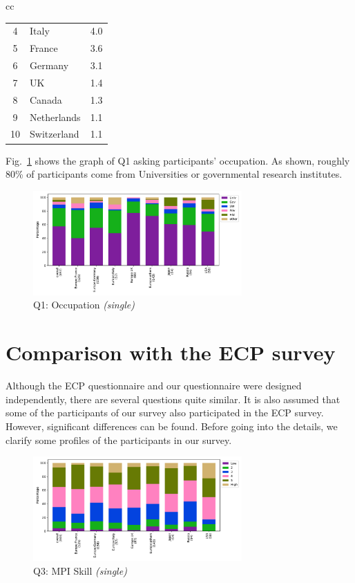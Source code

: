 \documentclass[conference,10pt,letterpaper]{IEEEtran}
\begin{document}
\begin{table}[htb]
\begin{center}
\begin{tabular}[t]{cc}
\begin{minipage}[t]{0.5\hsize}
\begin{center}
\begin{tabular}{c|l|r}
4  & Italy	  & 4.0  \\%
5  & France	  & 3.6  \\%
6  & Germany 	  & 3.1  \\%
7  & UK		  & 1.4  \\%
8  & Canada	  & 1.3  \\%
9  & Netherlands  & 1.1  \\%
10 & Switzerland  & 1.1  \\%
\hline%
\end{tabular}%
\end{center}%
\end{minipage}%
%
\end{tabular}%
\end{center}%
\end{table}%
%
%
Fig.~\ref{fig:occupation} shows the graph of Q1 asking participants'
occupation. As shown, roughly 80\% of participants come from
Universities or governmental research institutes.
%
\begin{figure}[htb]
\begin{center}
\includegraphics[width=8cm]{Figs/Q1.pdf}
\caption{Q1: Occupation {\it(single)}}
\label{fig:occupation}
\end{center}
\end{figure}

\section{Comparison with the ECP survey}

Although the ECP questionnaire and our questionnaire were designed
independently, there are several questions quite similar. It is also
assumed that some of the participants of our survey 
also participated in the ECP survey. However, significant differences
can be found. Before going into the details, we clarify some profiles
of the participants in our survey.

\begin{figure}[htb]
\begin{center}
\includegraphics[width=8cm]{Figs/Q3.pdf}
\caption{Q3: MPI Skill {\it(single)}}
\label{fig:mpi-skill}
\end{center}
\end{figure}
\end{document}
